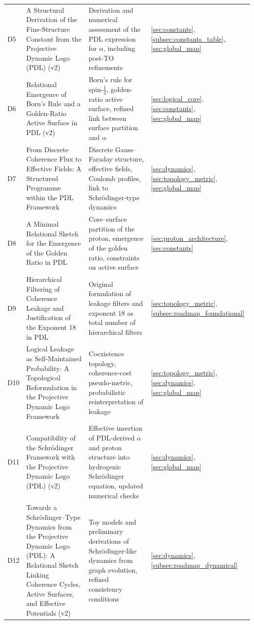\documentclass{article}
\begin{document}
\begin{longtable}{@{}p{0.9cm}L{5cm}L{5cm}p{4.4cm}@{}}
  D5 &
  A Structural Derivation of the Fine-Structure Constant from the Projective Dynamic Logo (PDL) (v2) &
  Derivation and numerical assessment of the PDL expression for $\alpha$, including post-TO refinements &
  \ref{sec:constants}, \ref{subsec:constants_table}, \ref{sec:global_map} \\[0.4em]

  D6 &
  Relational Emergence of Born's Rule and a Golden-Ratio Active Surface in PDL (v2) &
  Born's rule for spin-$\tfrac{1}{2}$, golden-ratio active surface, refined link between surface partition and $\alpha$ &
  \ref{sec:logical_core}, \ref{sec:constants}, \ref{sec:global_map} \\[0.4em]

  D7 &
  From Discrete Coherence Flux to Effective Fields: A Structured Programme within the PDL Framework &
  Discrete Gauss–Faraday structure, effective fields, Coulomb profiles, link to Schr\"odinger-type dynamics &
  \ref{sec:dynamics}, \ref{sec:topology_metric}, \ref{sec:global_map} \\[0.4em]

  D8 &
  A Minimal Relational Sketch for the Emergence of the Golden Ratio in PDL &
  Core–surface partition of the proton, emergence of the golden ratio, constraints on active surface &
  \ref{sec:proton_architecture}, \ref{sec:constants} \\[0.4em]

  D9 &
  Hierarchical Filtering of Coherence Leakage and Justification of the Exponent 18 in PDL &
  Original formulation of leakage filters and exponent $18$ as total number of hierarchical filters &
  \ref{sec:topology_metric}, \ref{subsec:roadmap_foundational} \\[0.4em]

  D10 &
  Logical Leakage as Self-Maintained Probability: A Topological Reformulation in the Projective Dynamic Logo Framework &
  Coexistence topology, coherence-cost pseudo-metric, probabilistic reinterpretation of leakage &
  \ref{sec:topology_metric}, \ref{sec:dynamics}, \ref{sec:global_map} \\[0.4em]

  D11 &
  Compatibility of the Schr\"odinger Framework with the Projective Dynamic Logo (PDL) (v2) &
  Effective insertion of PDL-derived $\alpha$ and proton structure into hydrogenic Schr\"odinger equation, updated numerical checks &
  \ref{sec:dynamics}, \ref{sec:global_map} \\[0.4em]

  D12 &
  Towards a Schr\"odinger--Type Dynamics from the Projective Dynamic Logo (PDL): A Relational Sketch Linking Coherence Cycles, Active Surfaces, and Effective Potentials (v2) &
  Toy models and preliminary derivations of Schr\"odinger-like dynamics from graph evolution, refined consistency conditions &
  \ref{sec:dynamics}, \ref{subsec:roadmap_dynamical} \\[0.4em]


\end{longtable}
\end{document}
